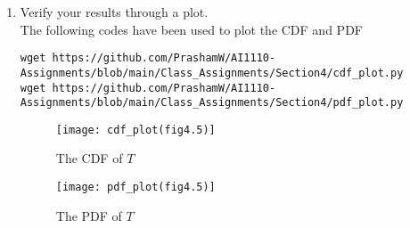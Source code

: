 \documentclass[journal,12pt,twocolumn]{IEEEtran}
\renewcommand\thesection{\arabic{section}}
\begin{document}
\begin{enumerate}[label=\thesection.\arabic*
,ref=\thesection.\theenumi]
	If $0 \le t \le 1$, then $x$ can take all values in $[0,t]$
	\begin{align}
		F_T(t)	&= \int_0^t \pr{U_2 \le t - x} p_{U_1}(x) \, dx \\
		&= \int_0^t F_{U_2}(t-x) p_{U_1}(x) \, dx
	\end{align}
	\begin{align}
		0 \le x \le t &\implies 0 \le t - x \le t \le 1 \\
		&\implies F_{U_2}(t-x) = t - x
	\end{align}
	\begin{align}
		F_T(t) &= \int_0^t (t-x) \cdot 1 \cdot \, dx \\
		&= \left. tx - \frac{x^2}{2} \right|_0^t \\
		&= \frac{t^2}{2}
	\end{align}
	
	If $1 < t < 2$, $x$ can only take values in $[0,1]$ as $U_1 \le 1$
	\begin{align}
		F_T(t)	&= \int_0^1 F_{U_2}(t-x) \cdot 1 \cdot \, dx 
	\end{align}
	\begin{align}
		0 \le x \le t - 1 &\implies 1 \le t - x \le t \\
		t - 1 \le x \le 1 &\implies 0 < t - 1 \le t - x \le 1
	\end{align}
	\begin{align}
		F_T(t) &= \int_0^{t-1} 1 \, dx + \int_{t-1}^1 (t-x)\, dx \\
		&= t - 1 + t(1 - (t - 1)) - \frac{1}{2} + \frac{(t-1)^2}{2} \\
		&= t - 1 + 2t - t^2 -\frac{1}{2} + \frac{t^2}{2} + \frac{1}{2} - t \\ 
		&= -\frac{t^2}{2} + 2t - 1
	\end{align}
	

\item Verify your results through a plot.\\
\solution
The following codes have been used to plot the CDF and PDF
\begin{lstlisting}
wget https://github.com/PrashamW/AI1110-Assignments/blob/main/Class_Assignments/Section4/cdf_plot.py
wget https://github.com/PrashamW/AI1110-Assignments/blob/main/Class_Assignments/Section4/pdf_plot.py
\end{lstlisting}
\begin{figure}
\centering
\texttt{[image: cdf\_plot(fig4.5)]}
\caption{The CDF of $T$}
\label{fig:cdf_plot(fig4.5)}
\end{figure}
\begin{figure}
\centering
\texttt{[image: pdf\_plot(fig4.5)]}
\caption{The PDF of $T$}
\label{fig:pdf_plot(fig4.5)}
\end{figure}

\end{enumerate}
\end{document}

